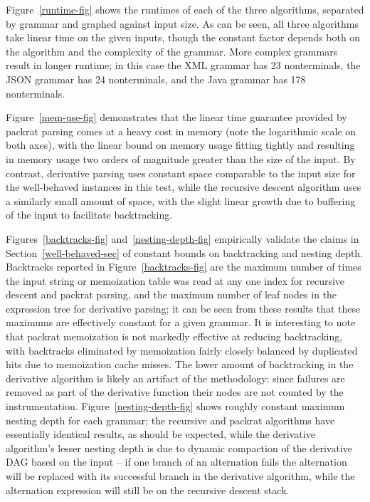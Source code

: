 \documentclass[submission,copyright,creativecommons]{eptcs}
\begin{document}
Figure~\ref{runtime-fig} shows the runtimes of each of the three algorithms, separated by grammar and graphed against input size. 
As can be seen, all three algorithms take linear time on the given inputs, though the constant factor depends both on the algorithm and the complexity of the grammar. 
More complex grammars result in longer runtime; in this case the XML grammar has 23 nonterminals, the JSON grammar has 24 nonterminals, and the Java grammar has 178 nonterminals. 

Figure~\ref{mem-use-fig} demonstrates that the linear time guarantee provided by packrat parsing comes at a heavy cost in memory (note the logarithmic scale on both axes), with the linear bound on memory usage fitting tightly and resulting in memory usage two orders of magnitude greater than the size of the input. 
By contrast, derivative parsing uses constant space comparable to the input size for the well-behaved instances in this test, while the recursive descent algorithm uses a similarly small amount of space, with the slight linear growth due to buffering of the input to facilitate backtracking.

Figures~\ref{backtracks-fig} and~\ref{nesting-depth-fig} empirically validate the claims in Section~\ref{well-behaved-sec} of constant bounds on backtracking and nesting depth. 
Backtracks reported in Figure~\ref{backtracks-fig} are the maximum number of times the input string or memoization table was read at any one index for recursive descent and packrat parsing, and the maximum number of leaf nodes in the expression tree for derivative parsing; it can be seen from these results that these maximums are effectively constant for a given grammar.
It is interesting to note that packrat memoization is not markedly effective at reducing backtracking, with backtracks eliminated by memoization fairly closely balanced by duplicated hits due to memoization cache misses.
The lower amount of backtracking in the derivative algorithm is likely an artifact of the methodology: since failures are removed as part of the derivative function their nodes are not counted by the instrumentation.
Figure~\ref{nesting-depth-fig} shows roughly constant maximum nesting depth for each grammar; the recursive and packrat algorithms have essentially identical results, as should be expected, while the derivative algorithm's lesser nesting depth is due to dynamic compaction of the derivative DAG based on the input -- if one branch of an alternation fails the alternation will be replaced with its successful branch in the derivative algorithm, while the alternation expression will still be on the recursive descent stack.
\end{document}
